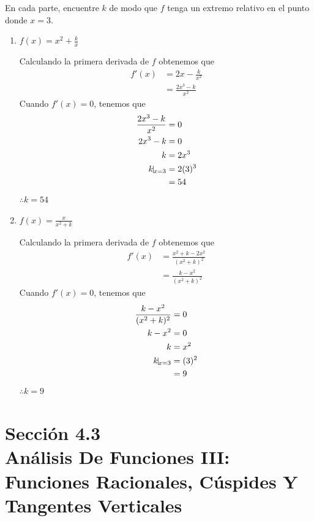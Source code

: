 \documentclass[12pt]{article}
\begin{document}
En cada parte, encuentre $k$ de modo que $f$ tenga un extremo relativo en el punto donde $x = 3$.
\begin{enumerate}[label=(\alph*)]
\item $f(x)=x^2+\frac{k}{x}$

  Calculando la primera derivada de $f$ obtenemos que
  \begin{align*}
    f'(x)
    &= 2x-\frac{k}{x^2} \\
    & = \frac{2x^3-k}{x^2}
  \end{align*}
  Cuando $f'(x)=0$, tenemos que
  \begin{align*}
    \frac{2x^3-k}{x^2}
    &=0\\
    2x^3-k
    &=0\\
    k
    &=2x^3\\
    k\vline_{x=3}
    &= 2(3)^3\\
    &=54
  \end{align*}
  $\therefore k=54$

\item $f(x)=\frac{x}{x^2+k}$
  

  Calculando la primera derivada de $f$ obtenemos que
  \begin{align*}
    f'(x)
    &= \frac{x^2+k-2x^2}{(x^2+k)^2}\\
    &= \frac{k-x^2}{(x^2+k)^2}
  \end{align*}
  Cuando $f'(x)=0$, tenemos que
  \begin{align*}
    \frac{k-x^2}{(x^2+k)^2}
    &=0\\
    k-x^2
    &=0\\
    k
    &=x^2\\
    k\vline_{x=3}
    &= (3)^2\\
    &=9
  \end{align*}
  $\therefore k=9$
\end{enumerate}

\section{Sección 4.3 \\  Análisis De Funciones III: Funciones Racionales, Cúspides Y Tangentes Verticales}
\end{document}
